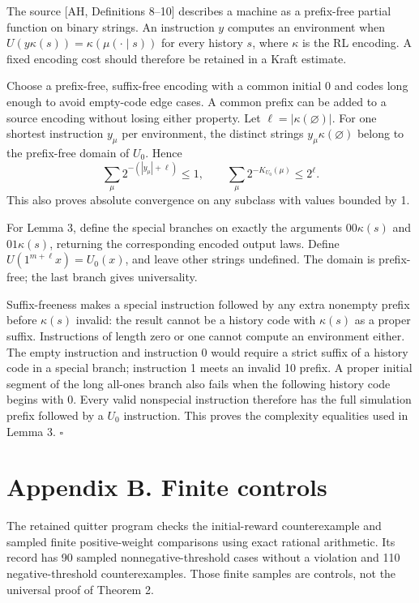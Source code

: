 \documentclass[
  11pt,
  letterpaper,
]{article}
\newcounter{none} %
\begin{document}
The source {[}AH, Definitions 8--10{]} describes a machine as a
prefix-free partial function on binary strings. An instruction \(y\)
computes an environment when \(U(y\kappa(s))=\kappa(\mu(\cdot\mid s))\)
for every history \(s\), where \(\kappa\) is the RL encoding. A fixed
encoding cost should therefore be retained in a Kraft estimate.

Choose a prefix-free, suffix-free encoding with a common initial 0 and
codes long enough to avoid empty-code edge cases. A common prefix can be
added to a source encoding without losing either property. Let
\(\ell=|\kappa(\varnothing)|\). For one shortest instruction \(y_\mu\)
per environment, the distinct strings \(y_\mu\kappa(\varnothing)\)
belong to the prefix-free domain of \(U_0\). Hence \[
       \sum_\mu2^{-(|y_\mu|+\ell)}\leq1,\qquad
       \sum_\mu2^{-K_{U_0}(\mu)}\leq2^\ell.
\] This also proves absolute convergence on any subclass with values
bounded by 1.

For Lemma 3, define the special branches on exactly the arguments
\(00\kappa(s)\) and \(01\kappa(s)\), returning the corresponding encoded
output laws. Define \(U(1^{m+\ell}x)=U_0(x)\), and leave other strings
undefined. The domain is prefix-free; the last branch gives
universality.

Suffix-freeness makes a special instruction followed by any extra
nonempty prefix before \(\kappa(s)\) invalid: the result cannot be a
history code with \(\kappa(s)\) as a proper suffix. Instructions of
length zero or one cannot compute an environment either. The empty
instruction and instruction 0 would require a strict suffix of a history
code in a special branch; instruction 1 meets an invalid 10 prefix. A
proper initial segment of the long all-ones branch also fails when the
following history code begins with 0. Every valid nonspecial instruction
therefore has the full simulation prefix followed by a \(U_0\)
instruction. This proves the complexity equalities used in Lemma 3.
\hfill\(\square\)

\section{Appendix B. Finite controls}\label{appendix-b.-finite-controls}

The retained quitter program checks the initial-reward counterexample
and sampled finite positive-weight comparisons using exact rational
arithmetic. Its record has 90 sampled nonnegative-threshold cases
without a violation and 110 negative-threshold counterexamples. Those
finite samples are controls, not the universal proof of Theorem 2.
\end{document}
